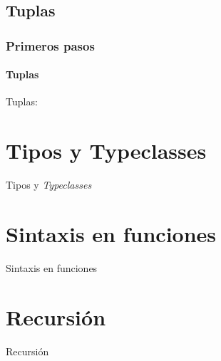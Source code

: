 \documentclass{beamer}
\begin{document}
\subsection{Tuplas}
\begin{frame}[fragile]
  \frametitle{Primeros pasos}
  \framesubtitle{Tuplas}
  \begin{block}{Tuplas:}
  \end{block}
\end{frame}

\section{Tipos y Typeclasses}
\begin{frame}{Tipos y \emph{Typeclasses}}      %

\end{frame}

\section{Sintaxis en funciones}
\begin{frame}{Sintaxis en funciones}      %

\end{frame}

\section{Recursión}
\begin{frame}{Recursión}      %

\end{frame}
\end{document}
